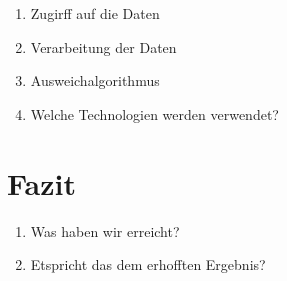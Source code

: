 \documentclass[12pt]{article}
\begin{document}
\begin{enumerate}
    \item Zugirff auf die Daten\\
    \item Verarbeitung der Daten\\
    \item Ausweichalgorithmus\\
    \item Welche Technologien werden verwendet?\\
\end{enumerate}


\section{Fazit}
\begin{enumerate}
    \item Was haben wir erreicht?\\
    \item Etspricht das dem erhofften Ergebnis?\\
\end{enumerate}
\end{document}
